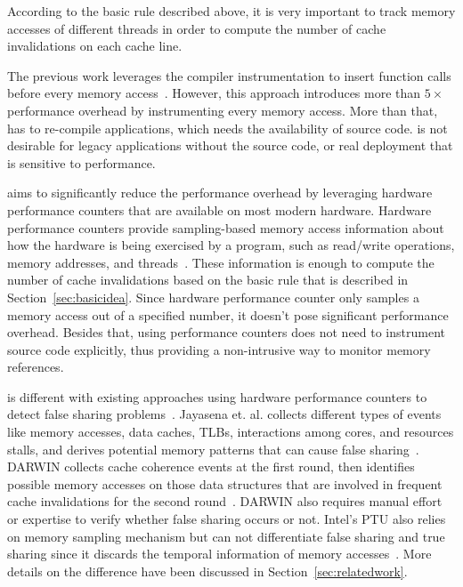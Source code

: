 According to the basic rule described above, it is very important to track memory accesses of different threads in order to compute the number of cache invalidations on each cache line. 

The previous work \Predator{} leverages the compiler instrumentation to insert function calls before every memory access~\cite{Predator}. However, this approach introduces more than $5\times$ performance overhead by instrumenting every memory access. More than that, \Predator{} has to re-compile applications, which needs the availability of source code. \Predator{} is not desirable for legacy applications without the source code, or real deployment that is sensitive to performance. 

\cheetah{} aims to significantly reduce the performance overhead by leveraging hardware performance counters that are available on most modern hardware. Hardware performance counters provide sampling-based memory access information about how the hardware is being exercised by a program, such as read/write operations, memory addresses, and threads~\cite{Mucci99papi}. These information is enough to compute the number of cache invalidations based on the basic rule that is described in Section~\ref{sec:basicidea}. Since hardware performance counter only samples a memory access out of a specified number, it doesn't pose significant performance overhead. 
Besides that, using performance counters does not need to instrument source code explicitly, thus providing a non-intrusive way to monitor memory references. 

\cheetah{} is different with existing approaches using hardware performance counters to detect false sharing problems~\cite{mldetect, openmp, detect:ptu}. Jayasena et. al. collects different types of events like memory accesses, data caches, TLBs, interactions among cores, and resources stalls, and derives potential memory patterns that can cause false sharing~\cite{mldetect}. DARWIN collects cache coherence events at the first round, then identifies possible memory accesses on those data structures that are involved in frequent cache invalidations for the second round~\cite{openmp}. DARWIN also requires manual effort or expertise to verify whether false sharing occurs or not.  Intel's PTU also relies on memory sampling mechanism but can not differentiate false sharing and true sharing since it discards the temporal information of memory accesses~\cite{detect:ptu}. More details on the difference have been discussed in Section~\ref{sec:relatedwork}.

